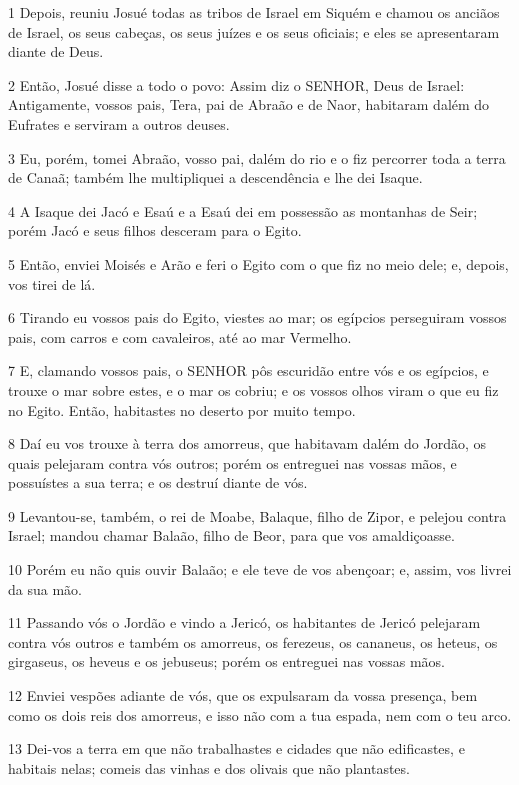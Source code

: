 \par 1 Depois, reuniu Josué todas as tribos de Israel em Siquém e chamou os anciãos de Israel, os seus cabeças, os seus juízes e os seus oficiais; e eles se apresentaram diante de Deus.
\par 2 Então, Josué disse a todo o povo: Assim diz o SENHOR, Deus de Israel: Antigamente, vossos pais, Tera, pai de Abraão e de Naor, habitaram dalém do Eufrates e serviram a outros deuses.
\par 3 Eu, porém, tomei Abraão, vosso pai, dalém do rio e o fiz percorrer toda a terra de Canaã; também lhe multipliquei a descendência e lhe dei Isaque.
\par 4 A Isaque dei Jacó e Esaú e a Esaú dei em possessão as montanhas de Seir; porém Jacó e seus filhos desceram para o Egito.
\par 5 Então, enviei Moisés e Arão e feri o Egito com o que fiz no meio dele; e, depois, vos tirei de lá.
\par 6 Tirando eu vossos pais do Egito, viestes ao mar; os egípcios perseguiram vossos pais, com carros e com cavaleiros, até ao mar Vermelho.
\par 7 E, clamando vossos pais, o SENHOR pôs escuridão entre vós e os egípcios, e trouxe o mar sobre estes, e o mar os cobriu; e os vossos olhos viram o que eu fiz no Egito. Então, habitastes no deserto por muito tempo.
\par 8 Daí eu vos trouxe à terra dos amorreus, que habitavam dalém do Jordão, os quais pelejaram contra vós outros; porém os entreguei nas vossas mãos, e possuístes a sua terra; e os destruí diante de vós.
\par 9 Levantou-se, também, o rei de Moabe, Balaque, filho de Zipor, e pelejou contra Israel; mandou chamar Balaão, filho de Beor, para que vos amaldiçoasse.
\par 10 Porém eu não quis ouvir Balaão; e ele teve de vos abençoar; e, assim, vos livrei da sua mão.
\par 11 Passando vós o Jordão e vindo a Jericó, os habitantes de Jericó pelejaram contra vós outros e também os amorreus, os ferezeus, os cananeus, os heteus, os girgaseus, os heveus e os jebuseus; porém os entreguei nas vossas mãos.
\par 12 Enviei vespões adiante de vós, que os expulsaram da vossa presença, bem como os dois reis dos amorreus, e isso não com a tua espada, nem com o teu arco.
\par 13 Dei-vos a terra em que não trabalhastes e cidades que não edificastes, e habitais nelas; comeis das vinhas e dos olivais que não plantastes.
